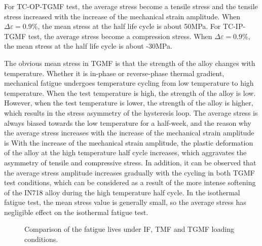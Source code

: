 For TC-OP-TGMF test, the average stress become a tensile stress and the tensile stress increased with the increase of the mechanical strain amplitude.
When $\Delta \varepsilon=0.9\%$, the mean stress at the half life cycle is about 50MPa. For TC-IP-TGMF test, the average stress become a compression stress. When $\Delta \varepsilon=0.9\%$, the mean stress at the half life cycle is about -30MPa.

The obvious mean stress in TGMF is that the strength of the alloy changes with temperature. Whether it is in-phase or reverse-phase thermal gradient, mechanical fatigue undergoes temperature cycling from low temperature to high temperature. When the test temperature is high, the strength of the alloy is low. However, when the test temperature is lower, the strength of the alloy is higher, which results in the stress asymmetry of the hysteresis loop. The average stress is always biased towards the low temperature for a half-week, and the reason why the average stress increases with the increase of the mechanical strain amplitude is With the increase of the mechanical strain amplitude, the plastic deformation of the alloy at the high temperature half cycle increases, which aggravates the asymmetry of tensile and compressive stress. In addition, it can be observed that the average stress amplitude increases gradually with the cycling in both TGMF test conditions, which can be considered as a result of the more intense softening of the IN718 alloy during the high temperature half cycle. In the isothermal fatigue test, the mean stress value is generally small, so the average stress has negligible effect on the isothermal fatigue test.

\begin{figure}[!htp]
\caption{Comparison of the fatigue lives under IF, TMF and TGMF loading conditions.}
\label{Fig:plot_exp_fatigue_life_TGMF}
\end{figure}

